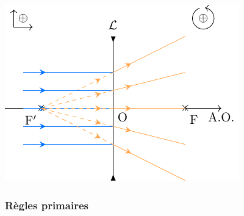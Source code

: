 \documentclass[../../main/main.tex]{subfiles}
\begin{document}
\begin{tcb}[label=exem:lentfoy, sidebyside]
\begin{center}
{		}{
			\includegraphics[width=\linewidth]{lent_div-Fp}
		}
		\label{fig:divfp}
	\end{center}
\end{tcb}

\subsubsection{Règles primaires}
\end{document}
